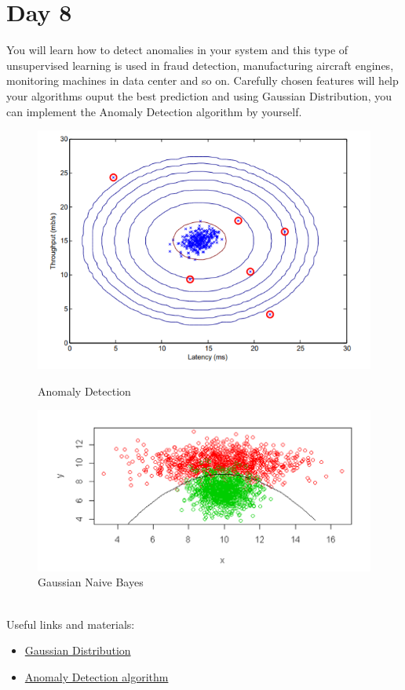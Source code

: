 \documentclass[11pt]{article}
\begin{document}
\section{Day 8}
You will learn how to detect anomalies in your system and this type of unsupervised learning is used in fraud detection, manufacturing aircraft engines, monitoring machines in data center and so on. Carefully chosen features will help your algorithms ouput the best prediction and using Gaussian Distribution, you can implement the Anomaly Detection algorithm by yourself.
\begin{figure}[h!]
\centering
\includegraphics[scale=.8]{img/ad.png}
{\caption*{Anomaly Detection}}
\centering
\hspace*{-1.1cm}   
\includegraphics[scale=.6]{img/gnb.png}
{\caption*{Gaussian Naive Bayes}}
\end{figure}\\
Useful links and materials:
\begin{itemize}
\item \href{https://www.youtube.com/watch?v=mh6rAYA0e7Q}{Gaussian Distribution}
\item \href{https://www.youtube.com/watch?v=g2YBWQnqOpw}{Anomaly Detection algorithm}
\end{itemize}
\pagebreak
\end{document}
